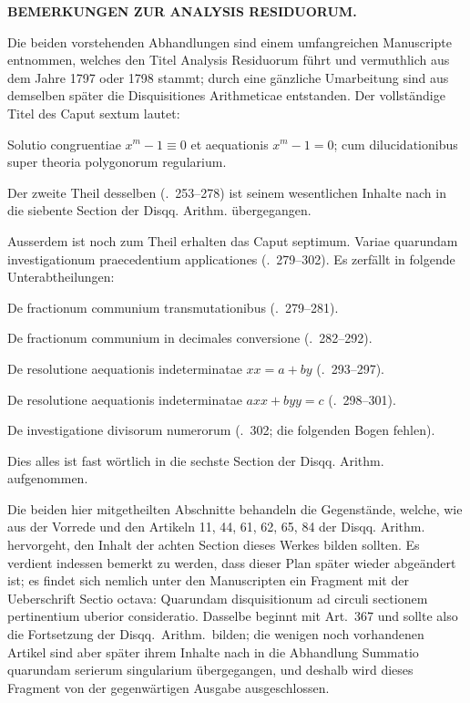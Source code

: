 \par\bigskip{}
\begin{center}\large\bfseries BEMERKUNGEN ZUR ANALYSIS RESIDUORUM.\end{center}
\renewcommand{\BookRunningTitle}{Nachlass. Bemerkungen zur Analysis residuorum}

Die beiden vorstehenden Abhandlungen sind einem umfangreichen Manu\-scripte entnommen, welches den Titel Analysis Residuorum führt und vermuthlich aus dem Jahre 1797 oder 1798 stammt; durch eine gänzliche Umarbeitung sind aus demselben später die Disquisitiones Arithmeticae entstanden. Der vollständige Titel des Caput sextum lautet:

Solutio congruentiae $x^m-1\equiv0$ et aequationis $x^m-1=0$; cum dilucidationibus super theoria polygonorum regularium.

Der zweite Theil desselben (\textsection\textsection.\ 253--278) ist seinem wesentlichen Inhalte nach in die siebente Section der Disqq. Arithm. übergegangen.

Ausserdem ist noch zum Theil erhalten das Caput septimum. Variae quarundam investigationum praecedentium applicationes (\textsection\textsection.\ 279--302). Es zerfällt in folgende Unterabtheilungen:

De fractionum communium transmutationibus (\textsection\textsection.\ 279--281).

De fractionum communium in decimales conversione (\textsection\textsection.\ 282--292).

De resolutione aequationis indeterminatae $xx=a+by$ (\textsection\textsection.\ 293--297).

De resolutione aequationis indeterminatae $axx+byy=c$ (\textsection\textsection.\ 298--301).

De investigatione divisorum numerorum (\textsection.\ 302; die folgenden Bogen fehlen).

Dies alles ist fast wörtlich in die sechste Section der Disqq. Arithm. aufgenommen.

Die beiden hier mitgetheilten Abschnitte behandeln die Gegenstände, welche, wie aus der Vorrede und den Artikeln 11, 44, 61, 62, 65, 84 der Disqq. Arithm. hervorgeht, den Inhalt der achten Section dieses Werkes bilden sollten. Es verdient indessen bemerkt zu werden, dass dieser Plan später wieder abgeändert ist; es findet sich nemlich unter den Manuscripten ein Fragment mit der Ueberschrift Sectio octava: Quarundam disquisitionum ad circuli sectionem pertinentium uberior consideratio. Dasselbe 
beginnt mit Art.\ 367 und sollte also die Fortsetzung der Disqq.\ Arithm.\ bilden; die wenigen noch vorhandenen Artikel sind aber später ihrem Inhalte nach in die Abhandlung Summatio quarundam serierum singularium übergegangen, und deshalb wird dieses Fragment von der gegenwärtigen Ausgabe ausgeschlossen.

